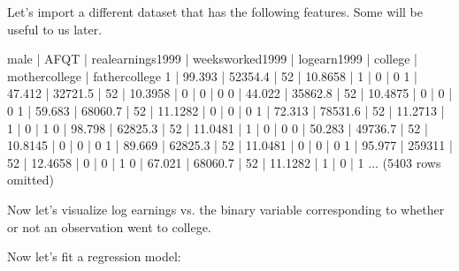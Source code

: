 \documentclass[letterpaper,10pt,english]{jupyterBook}
\begin{document}
\sphinxAtStartPar
Let’s import a different dataset that has the following features. Some will be useful to us later.

\begin{sphinxVerbatim}[commandchars=\\\{\}]
  
\end{sphinxVerbatim}

\begin{sphinxVerbatim}[commandchars=\\\{\}]
male | AFQT   | real\PYGZus{}earnings\PYGZus{}1999 | weeks\PYGZus{}worked\PYGZus{}1999 | log\PYGZus{}earn\PYGZus{}1999 | college | mother\PYGZus{}college | father\PYGZus{}college
1    | 99.393 | 52354.4            | 52                | 10.8658       | 1       | 0              | 0
1    | 47.412 | 32721.5            | 52                | 10.3958       | 0       | 0              | 0
0    | 44.022 | 35862.8            | 52                | 10.4875       | 0       | 0              | 0
1    | 59.683 | 68060.7            | 52                | 11.1282       | 0       | 0              | 0
1    | 72.313 | 78531.6            | 52                | 11.2713       | 1       | 0              | 1
0    | 98.798 | 62825.3            | 52                | 11.0481       | 1       | 0              | 0
0    | 50.283 | 49736.7            | 52                | 10.8145       | 0       | 0              | 0
1    | 89.669 | 62825.3            | 52                | 11.0481       | 0       | 0              | 0
1    | 95.977 | 259311             | 52                | 12.4658       | 0       | 0              | 1
0    | 67.021 | 68060.7            | 52                | 11.1282       | 1       | 0              | 1
... (5403 rows omitted)
\end{sphinxVerbatim}

\sphinxAtStartPar
Now let’s visualize log earnings vs. the binary variable corresponding to whether or not an observation went to college.

\noindent{}

\noindent{}

\sphinxAtStartPar
Now let’s fit a regression model:
\end{document}
